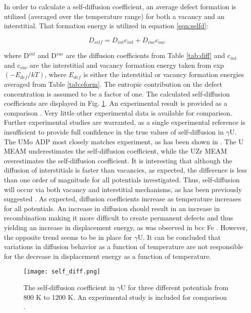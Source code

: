 \documentclass[review]{elsarticle}
\begin{document}
In order to calculate a self-diffusion coefficient, an average defect formation is utilized (averaged over the temperature range) for both a vacancy and an interstitial. That formation energy is utilized in equation \ref{eqn:selfd}:

\begin{equation}
\label{eqn:selfd}
D_{self} = D_{int}c_{int} + D_{vac}c_{vac}
\end{equation} 

where D$^{int}$ and D$^{vac}$ are the diffusion coefficients from Table \ref{tab:diff} and c$_{int}$ and c$_{vac}$ are the interstitial and vacancy formation energy taken from exp$(-E_{def}/kT)$, where $E_{def}$ is either the interstitial or vacancy formation energies averaged from Table \ref{tab:eform}. The entropic contribution on the defect concentration is assumed to be a factor of one. The calculated self-diffusion coefficients are displayed in Fig. \ref{fig:gamUdiff}. An experimental result is provided as a comparison \cite{adda1959}. Very little other experimental data is available for comparison. Further experimental studies are warranted, as a single experimental reference is insufficient to provide full confidence in the true values of self-diffusion in $\gamma$U. The UMo ADP most closely matches experiment, as has been shown in \cite{smirnovaADP}. The U MEAM underestimates the self-diffusion coefficient, while the UZr MEAM overestimates the self-diffusion coefficient. It is interesting that although the diffusion of interstitials is faster than vacancies, as expected, the difference is less than one order of magnitude for all potentials investigated. Thus, self-diffusion will occur via both vacancy and interstitial mechanisms, as has been previously suggested \cite{fedorov1978, smirnov1992}. As expected, diffusion coefficients increase as temperature increases for all potentials. An increase in diffusion should result in an increase in recombination making it more difficult to create permanent defects and thus yielding an increase in displacement energy, as was observed in bcc Fe \cite{beeler2016}. However, the opposite trend seems to be in place for $\gamma$U. It can be concluded that variations in diffusion behavior as a function of temperature are not responsible for the decrease in displacement energy as a function of temperature.

\begin{figure}[h]
 \centering
 \texttt{[image: self\_diff.png]} 
 \caption{The self-diffusion coefficient in $\gamma$U for three different potentials from 800 K to 1200 K. An experimental study is included for comparison \cite{adda1959}.}
 \label{fig:gamUdiff}
\end{figure}
\end{document}
